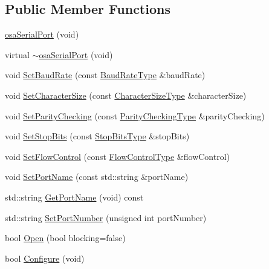 \subsection*{Public Member Functions}
\begin{DoxyCompactItemize}
\item 
\hyperlink{classosa_serial_port_aec2efe7da1b46d934f2fe588defa16ed}{osa\+Serial\+Port} (void)
\item 
virtual \hyperlink{classosa_serial_port_a4e808949ec9d28e9e79fe81065b092be}{$\sim$osa\+Serial\+Port} (void)
\item 
void \hyperlink{classosa_serial_port_a36b6562b689bcf2239d250e3d63a9ee8}{Set\+Baud\+Rate} (const \hyperlink{group__cisst_o_s_abstraction_ga3fd8e997892088f924754f9cc11c78a4}{Baud\+Rate\+Type} \&baud\+Rate)
\item 
void \hyperlink{classosa_serial_port_abeae13a35499433f635fc95521d5ac88}{Set\+Character\+Size} (const \hyperlink{group__cisst_o_s_abstraction_ga9b6b558d8e4327ca921d9c010bec0462}{Character\+Size\+Type} \&character\+Size)
\item 
void \hyperlink{classosa_serial_port_a11750b56a0238acc1c758d142906d8d7}{Set\+Parity\+Checking} (const \hyperlink{group__cisst_o_s_abstraction_ga5a7547284e891eed488992c6a7204bfa}{Parity\+Checking\+Type} \&parity\+Checking)
\item 
void \hyperlink{classosa_serial_port_ad882a5b66ba2f573539d064e46190dd0}{Set\+Stop\+Bits} (const \hyperlink{group__cisst_o_s_abstraction_gaaa561ff95e10634b7ffa9ebf0ff164b5}{Stop\+Bits\+Type} \&stop\+Bits)
\item 
void \hyperlink{classosa_serial_port_af49c463657ff6669380f0f6428d9b91a}{Set\+Flow\+Control} (const \hyperlink{group__cisst_o_s_abstraction_ga006138c4626520d3c2c1e5a78b279435}{Flow\+Control\+Type} \&flow\+Control)
\item 
void \hyperlink{classosa_serial_port_ab1c787036a143b1e2da9386a4be70948}{Set\+Port\+Name} (const std\+::string \&port\+Name)
\item 
std\+::string \hyperlink{classosa_serial_port_a946d8eaa779242690651a34ceacb33d7}{Get\+Port\+Name} (void) const 
\item 
std\+::string \hyperlink{classosa_serial_port_afba9a147f69981a5dbf70ffb558c725c}{Set\+Port\+Number} (unsigned int port\+Number)
\item 
bool \hyperlink{classosa_serial_port_ad0f93f7bb53646340f7fa7a485ba7a12}{Open} (bool blocking=false)
\item 
bool \hyperlink{classosa_serial_port_ab9052ac79c44c27f09abdde9b7c39aa5}{Configure} (void)

\end{DoxyCompactItemize}

